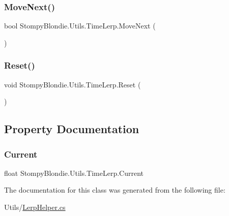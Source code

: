 \subsubsection{\texorpdfstring{Move\+Next()}{MoveNext()}}
{\footnotesize\ttfamily bool Stompy\+Blondie.\+Utils.\+Time\+Lerp.\+Move\+Next (\begin{DoxyParamCaption}{ }\end{DoxyParamCaption})\hspace{0.3cm}{\ttfamily [inline]}}

\mbox{\label{class_stompy_blondie_1_1_utils_1_1_time_lerp_a471266f48a72cf51013cc9333b026076}} 
\subsubsection{\texorpdfstring{Reset()}{Reset()}}
{\footnotesize\ttfamily void Stompy\+Blondie.\+Utils.\+Time\+Lerp.\+Reset (\begin{DoxyParamCaption}{ }\end{DoxyParamCaption})\hspace{0.3cm}{\ttfamily [inline]}}



\subsection{Property Documentation}
\mbox{\label{class_stompy_blondie_1_1_utils_1_1_time_lerp_a1caee886c2d6305e949dfa241553432f}} 
\subsubsection{\texorpdfstring{Current}{Current}}
{\footnotesize\ttfamily float Stompy\+Blondie.\+Utils.\+Time\+Lerp.\+Current\hspace{0.3cm}{\ttfamily [get]}}



The documentation for this class was generated from the following file\+:\begin{DoxyCompactItemize}
\item 
Utils/\mbox{\hyperlink{_lerp_helper_8cs}{Lerp\+Helper.\+cs}}\end{DoxyCompactItemize}
